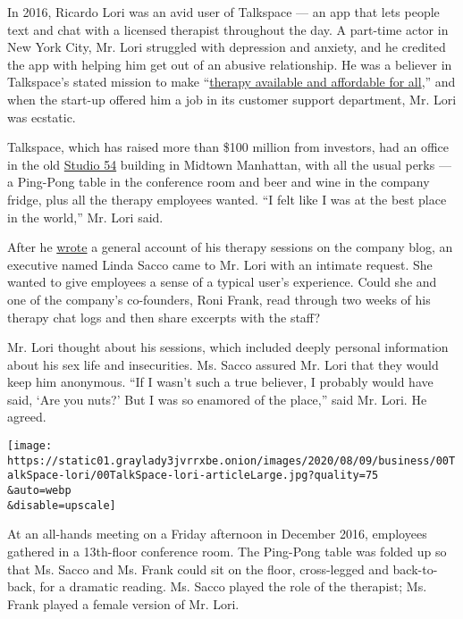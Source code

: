 In 2016, Ricardo Lori was an avid user of Talkspace --- an app that lets
people text and chat with a licensed therapist throughout the day. A
part-time actor in New York City, Mr. Lori struggled with depression and
anxiety, and he credited the app with helping him get out of an abusive
relationship. He was a believer in Talkspace's stated mission to make
``\href{https://help.talkspace.com/hc/en-us?_ga=2.27016189.171121636.1593548307-1918767659.1593034870}{therapy
available and affordable for all},'' and when the start-up offered him a
job in its customer support department, Mr. Lori was ecstatic.

Talkspace, which has raised more than \$100 million from investors, had
an office in the old
\href{https://www.nytimes3xbfgragh.onion/2018/10/04/movies/studio-54-review.html}{Studio
54} building in Midtown Manhattan, with all the usual perks --- a
Ping-Pong table in the conference room and beer and wine in the company
fridge, plus all the therapy employees wanted. ``I felt like I was at
the best place in the world,'' Mr. Lori said.

After he
\href{https://www.talkspace.com/blog/ricardo-used-talkspace-overcome-depression-anxiety-abuse/}{wrote}
a general account of his therapy sessions on the company blog, an
executive named Linda Sacco came to Mr. Lori with an intimate request.
She wanted to give employees a sense of a typical user's experience.
Could she and one of the company's co-founders, Roni Frank, read through
two weeks of his therapy chat logs and then share excerpts with the
staff?

Mr. Lori thought about his sessions, which included deeply personal
information about his sex life and insecurities. Ms. Sacco assured Mr.
Lori that they would keep him anonymous. ``If I wasn't such a true
believer, I probably would have said, `Are you nuts?' But I was so
enamored of the place,'' said Mr. Lori. He agreed.

\texttt{[image: https://static01.graylady3jvrrxbe.onion/images/2020/08/09/business/00TalkSpace-lori/00TalkSpace-lori-articleLarge.jpg?quality=75\\\&auto=webp\\\&disable=upscale]}

At an all-hands meeting on a Friday afternoon in December 2016,
employees gathered in a 13th-floor conference room. The Ping-Pong table
was folded up so that Ms. Sacco and Ms. Frank could sit on the floor,
cross-legged and back-to-back, for a dramatic reading. Ms. Sacco played
the role of the therapist; Ms. Frank played a female version of Mr.
Lori.


